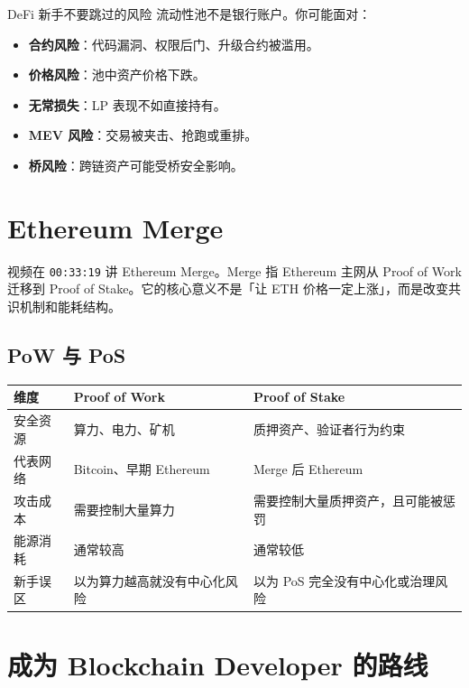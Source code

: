 \documentclass[UTF8,11pt]{ctexart}
\newcommand{\term}[1]{\textbf{\sffamily #1}}
\newcommand{\timestamp}[1]{\textcolor{blue!50!black}{\texttt{#1}}}
\begin{document}
\begin{warnbox}{DeFi 新手不要跳过的风险}
流动性池不是银行账户。你可能面对：
\begin{itemize}
  \item \term{合约风险}：代码漏洞、权限后门、升级合约被滥用。
  \item \term{价格风险}：池中资产价格下跌。
  \item \term{无常损失}：LP 表现不如直接持有。
  \item \term{MEV 风险}：交易被夹击、抢跑或重排。
  \item \term{桥风险}：跨链资产可能受桥安全影响。
\end{itemize}
\end{warnbox}

\section{Ethereum Merge}

视频在 \timestamp{00:33:19} 讲 Ethereum Merge。Merge 指 Ethereum 主网从 Proof of Work 迁移到 Proof of Stake。它的核心意义不是「让 ETH 价格一定上涨」，而是改变共识机制和能耗结构。

\subsection{PoW 与 PoS}

\begin{longtable}{>{\raggedright\arraybackslash}p{3.6cm}>{\raggedright\arraybackslash}p{5.6cm}>{\raggedright\arraybackslash}p{5.6cm}}
\toprule
\textbf{维度} & \textbf{Proof of Work} & \textbf{Proof of Stake} \\
\midrule
\endhead
安全资源 & 算力、电力、矿机 & 质押资产、验证者行为约束 \\
代表网络 & Bitcoin、早期 Ethereum & Merge 后 Ethereum \\
攻击成本 & 需要控制大量算力 & 需要控制大量质押资产，且可能被惩罚 \\
能源消耗 & 通常较高 & 通常较低 \\
新手误区 & 以为算力越高就没有中心化风险 & 以为 PoS 完全没有中心化或治理风险 \\
\bottomrule
\end{longtable}

\section{成为 Blockchain Developer 的路线}
\label{sec:developer}
\end{document}
